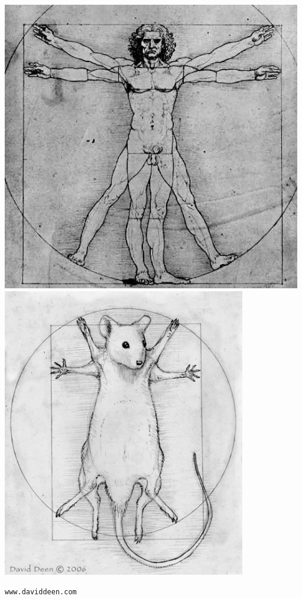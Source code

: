 \documentclass[12pt]{article}
\newcommand{\smallestsize}{\fontsize{18}{22} \selectfont}
\begin{document}
\centerline{
\includegraphics[height=5in]{Figs/da-vinci-man.jpg}
\includegraphics[height=5in]{Figs/vitruvian_mouse.jpg} 
}

{\color{myblue} \smallestsize \hfill \verb|www.daviddeen.com| \hspace*{11mm}}
\end{document}
